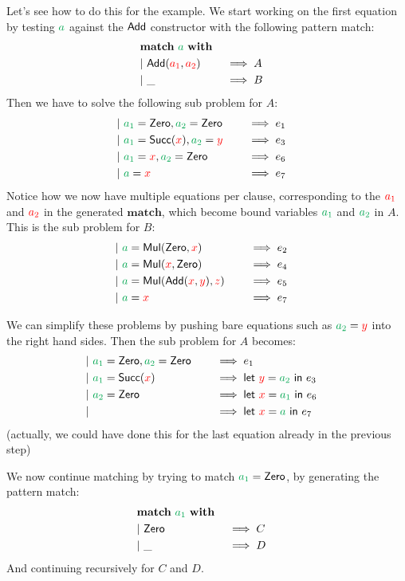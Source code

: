 \documentclass[a4paper, 11pt]{article}
\theoremstyle{definition}
\begin{document}
Let's see how to do this for the example. We start working on the first equation by testing $\ba$ against the $\mathsf{\textcolor{black}{Add}}$ constructor with the following pattern match:
\begin{alignat*}{4}
  \matchwith{\ba} \\
  \clause{\Add(\fvar{a_1}, \fvar{a_2})}{A} \\
  \clause{\_}{B}
\end{alignat*}
Then we have to solve the following sub problem for $A$:
\begin{alignat*}{4}
  \clause{\bvar{a_1} = \Zero, \bvar{a_2} = \Zero}{e_1} \\
  \clause{\bvar{a_1} = \Succ(\fvar x), \bvar{a_2} = \fvar y}{e_3} \\
  \clause{\bvar{a_1} = \fvar x, \bvar{a_2} = \Zero}{e_6} \\
  \clause{\ba = \fvar x}{e_7}
\end{alignat*}
Notice how we now have multiple equations per clause, corresponding to the $\textcolor{red}{a_1}$ and $\textcolor{red}{a_2}$ in the generated $\mathbf{match}$, which become bound variables $\bvar{a_1}$ and $\bvar{a_2}$ in $A$. This is the sub problem for $B$:
\begin{alignat*}{4}
  \clause{\ba = \Mul(\Zero, \fvar{x})}{e_2} \\
  \clause{\ba = \Mul(\fvar x, \Zero)}{e_4} \\
  \clause{\ba = \Mul(\Add(\fvar x, \fvar y), \fvar z)}{e_5} \\
  \clause{\ba = \fvar x}{e_7}
\end{alignat*}

We can simplify these problems by pushing bare equations such as $\bvar{a_2} = \fvar y$ into the right hand sides. Then the sub problem for $A$ becomes:
\begin{alignat*}{4}
  \clause{\bvar{a_1} = \Zero, \bvar{a_2} = \Zero}{e_1} \\
  \clause{\bvar{a_1} = \Succ(\fvar x)}{\lett{\fvar y}{\bvar{a_2}} e_3} \\
  \clause{\bvar{a_2} = \Zero}{\lett{\fvar x}{\bvar{a_1}} e_6} \\
  \clause{}{\lett{\fvar x}{\bvar{a}} e_7}
\end{alignat*}
(actually, we could have done this for the last equation already in the previous step)

We now continue matching by trying to match $\bvar{a_1} = \Zero$, by generating the pattern match:
\begin{alignat*}{4}
  \matchwith{\bvar{a_1}} \\
  \clause{\Zero}{C} \\
  \clause{\_}{D}
\end{alignat*}
And continuing recursively for $C$ and $D$.
\end{document}
